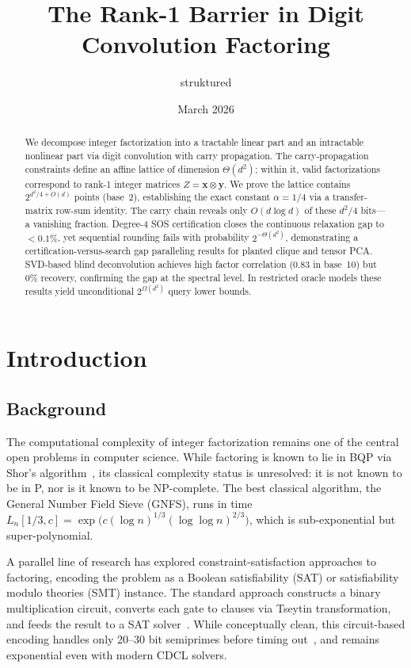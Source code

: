 \documentclass[11pt,a4paper]{article}
\title{The Rank-1 Barrier in Digit Convolution Factoring}
\author[1]{struktured}
\affil[1]{struktured labs}
\date{March 2026}
\begin{document}
\maketitle

\begin{abstract}
We decompose integer factorization into a tractable linear part and an intractable nonlinear part via digit convolution with carry propagation.
The carry-propagation constraints define an affine lattice of dimension $\Theta(d^2)$; within it, valid factorizations correspond to rank-1 integer matrices $Z = \mathbf{x}\otimes\mathbf{y}$.
We prove the lattice contains $2^{d^2/4+O(d)}$ points (base~2), establishing the exact constant $\alpha=1/4$ via a transfer-matrix row-sum identity.
The carry chain reveals only $O(d\log d)$ of these $d^2/4$ bits---a vanishing fraction.
Degree-4 SOS certification closes the continuous relaxation gap to $<0.1\%$, yet sequential rounding fails with probability $2^{-\Theta(d^2)}$, demonstrating a certification-versus-search gap paralleling results for planted clique and tensor PCA.
SVD-based blind deconvolution achieves high factor correlation ($0.83$ in base~10) but $0\%$ recovery, confirming the gap at the spectral level.
In restricted oracle models these results yield unconditional $2^{\Omega(d^2)}$ query lower bounds.
\end{abstract}

\section{Introduction}

\subsection{Background}

The computational complexity of integer factorization remains one of the central open problems in computer science. While factoring is known to lie in BQP via Shor's algorithm~\cite{shor94}, its classical complexity status is unresolved: it is not known to be in P, nor is it known to be NP-complete. The best classical algorithm, the General Number Field Sieve (GNFS), runs in time $L_n[1/3, c] = \exp\bigl(c (\log n)^{1/3} (\log \log n)^{2/3}\bigr)$, which is sub-exponential but super-polynomial.

A parallel line of research has explored constraint-satisfaction approaches to factoring, encoding the problem as a Boolean satisfiability (SAT) or satisfiability modulo theories (SMT) instance. The standard approach constructs a binary multiplication circuit, converts each gate to clauses via Tseytin transformation, and feeds the result to a SAT solver~\cite{yurichev}. While conceptually clean, this circuit-based encoding handles only 20--30 bit semiprimes before timing out~\cite{satfactor}, and remains exponential even with modern CDCL solvers.
\end{document}
